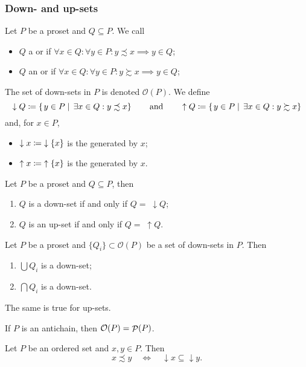 \subsubsection{Down- and up-sets}
\begin{definition}
Let $P$ be a proset and $Q\subseteq P$. We call
\begin{itemize}
\item $Q$ a  or  if $\forall x\in Q: \forall y\in P: y\precsim x \implies y\in Q$;
\item $Q$ an  or  if $\forall x\in Q: \forall y\in P: y\succsim x \implies y\in Q$;
\end{itemize}
The set of down-sets in $P$ is denoted $\mathcal{O}(P)$. We define
\[ \downarrow Q \coloneqq \left\{\left. y\in P \;\right|\; \exists x\in Q: y\precsim x \right\} \qquad \text{and} \qquad \uparrow Q \coloneqq \left\{\left. y\in P \;\right|\; \exists x\in Q: y\succsim x \right\} \]
and, for $x\in P$,
\begin{itemize}
\item $\downarrow x \coloneqq \;\downarrow\{x\}$ is the  generated by $x$;
\item $\uparrow x \coloneqq \;\uparrow\{x\}$ is the  generated by $x$.
\end{itemize}
\end{definition}
\begin{lemma}
Let $P$ be a proset and $Q\subseteq P$, then
\begin{enumerate}
\item $Q$ is a down-set \textup{if and only if} $Q = \;\downarrow Q$;
\item $Q$ is an up-set \textup{if and only if} $Q = \;\uparrow Q$.
\end{enumerate}
\end{lemma}

\begin{lemma}
Let $P$ be a proset and $\{Q_i\}\subset \mathcal{O}(P)$ be a set of down-sets in $P$. Then
\begin{enumerate}
\item $\bigcup Q_i$ is a down-set;
\item $\bigcap Q_i$ is a down-set.
\end{enumerate}
The same is true for up-sets.
\end{lemma}

If $P$ is an antichain, then $\mathcal{O}(P) = \mathop{\mathcal{P}}(P)$.

\begin{lemma}
Let $P$ be an ordered set and $x, y \in P$. Then
\[ x\precsim y \quad\iff\quad \downarrow x \subseteq \downarrow y. \]
\end{lemma}

